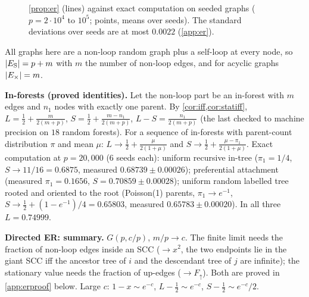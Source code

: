 \begin{figure}[h]
\centering
{}
\vskip -0.1in
\caption{\cref{prop:er} (lines) against exact computation on seeded graphs
($p=2\cdot10^4$ to $10^5$; points, means over seeds). The standard deviations
over seeds are at most $0.0022$ (\cref{app:er}).}
\label{fig:er}
\vskip -0.15in
\end{figure}

All graphs here are a non-loop random graph plus a self-loop at every node, so
$|E_{\mathrm S}|=p+m$ with $m$ the number of non-loop edges, and for acyclic graphs
$|E_{\times}|=m$.

\textbf{In-forests (proved identities).} Let the non-loop part be an in-forest
with $m$ edges and $n_1$ nodes with exactly one parent. By
\cref{cor:iff,cor:statiff},
$L=\tfrac12+\frac{m}{2(m+p)}$, $S=\tfrac12+\frac{m-n_1}{2(m+p)}$,
$L-S=\frac{n_1}{2(m+p)}$ (the last checked to machine precision on $18$ random
forests). For a sequence of in-forests with parent-count distribution $\pi$ and
mean $\mu$: $L\to\tfrac12+\frac\mu{2(1+\mu)}$ and
$S\to\tfrac12+\frac{\mu-\pi_1}{2(1+\mu)}$. Exact computation at $p=20{,}000$
(6 seeds each): uniform recursive in-tree ($\pi_1=1/4$, $S\to11/16=0.6875$,
measured $0.68739\pm0.00026$); preferential attachment (measured $\pi_1=0.1656$,
$S=0.70859\pm0.00028$); uniform random labelled tree rooted and oriented to the
root (Poisson(1) parents, $\pi_1\to e^{-1}$, $S\to\tfrac12+(1-e^{-1})/4=0.65803$,
measured $0.65783\pm0.00020$). In all three $L=0.74999$.

\textbf{Directed ER: summary.} $G(p,c/p)$, $m/p\to c$. The finite limit needs
the fraction of non-loop edges inside an SCC ($\to x^2$, the two endpoints lie in
the giant SCC iff the ancestor tree of $i$ and the descendant tree of $j$ are
infinite); the stationary value needs the fraction of up-edges
($\to F_\uparrow$). Both are proved in \cref{app:erproof} below. Large $c$:
$1-x\sim e^{-c}$, $L-\tfrac12\sim e^{-c}$, $S-\tfrac12\sim e^{-c}/2$.

